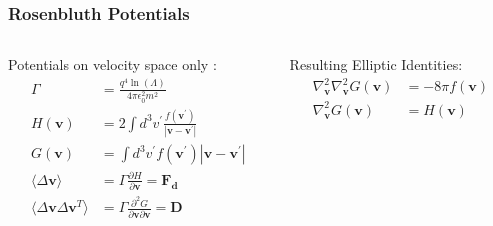 \documentclass[.08pt,aspectratio=169,t]{beamer}
\begin{document}
 \begin{frame}
 \frametitle{Rosenbluth Potentials \cite{rosenbluth}}

	 \begin{columns}[t] 
		 \begin{column}{0.5\textwidth}
 Potentials on velocity space only \cite{PlasmaKineticTheory}:
 \begin{align}
	 \Gamma   &= \frac{q^4 \ln(\Lambda)}{4 \pi \epsilon_0^2 m^2} \\[9pt]
	 H(\bm v) &=  2 \int d^3 v^\prime \frac{f(\bm{v^\prime})}{|\bm v - \bm{v^\prime}|} \\[9pt]
	 G(\bm v) &=  \int d^3 v^\prime f(\bm{v^\prime}) |\bm v - \bm{v^\prime}| \\[9pt]
	 \langle \Delta\mathbf{v} \rangle &=  \Gamma \frac{\partial H}{\partial \bm v} = \bm{F_d} \\[9pt]
	 \langle \Delta\mathbf{v}\Delta\mathbf{v}^T \rangle &=  \Gamma \frac{\partial^2 G}{\partial \bm v \partial \bm v} = \bm D
 \end{align}	
 \end{column}
 \hspace{-8pt}
 \vrule{}
 \hspace{+7pt}
		 \begin{column}{0.4\textwidth}
 Resulting Elliptic Identities: \\[6pt]
 \begin{align}
	 \nabla_{\bm{v}}^2 \nabla_{\bm{v}}^2 G(\bm v) &=  -8 \pi f(\bm v) \\[21pt]
	 \nabla_{\bm{v}}^2 G(\bm v) &= H(\bm v)
 \end{align}	
 \end{column}
\end{columns}

 \end{frame}


\end{document}
